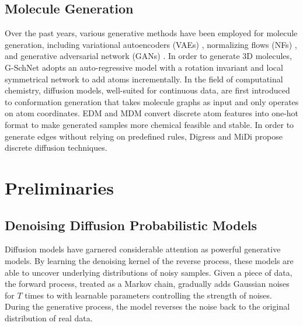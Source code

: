\documentclass[letterpaper]{article} %
\begin{document}
\subsection{Molecule Generation}
Over the past years, various generative methods have been employed for molecule generation, including variational autoencoders (VAEs) \cite{vae_13_kingma}, normalizing flows (NFs) \cite{nice_15_dinh}, and generative adversarial network (GANs) \cite{gan_14_goodfellow}. In order to generate 3D molecules, G-SchNet \cite{gschnet_19_wallach} adopts an auto-regressive model with a rotation invariant and local symmetrical network to add atoms incrementally. 
In the field of computatinal chemistry, diffusion models, well-suited for continuous data, are first introduced to conformation generation that takes molecule graphs as input and only operates on atom coordinates. 
EDM \cite{edm_22_hoogeboom} and MDM \cite{mdm_23_huang} convert discrete atom features into one-hot format to make generated samples more chemical feasible and stable. In order to generate edges without relying on predefined rules, Digress \cite{digress_22_vignac} and MiDi \cite{midi_23_vignac} propose discrete diffusion techniques. 





\section{Preliminaries}
\subsection{Denoising Diffusion Probabilistic Models}
Diffusion models have garnered considerable attention as powerful generative models. By learning the denoising kernel of the reverse process, these models are able to uncover underlying distributions of noisy samples. Given a piece of data, the forward process, treated as a Markov chain, gradually adds Gaussian noises for $T$ times to with learnable parameters controlling the strength of noises. During the generative process, the model reverses the noise back to the original distribution of real data.
\end{document}
